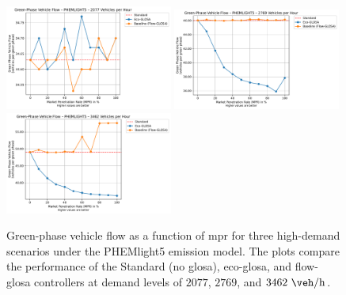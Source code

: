 \begin{figure}[htb]
  \centering
  \includegraphics[width=0.49\textwidth]{data/img/GreenPhaseVehicleFlow/GreenPhaseVehicleFlow_PHEMLIGHT5_Cars1500.pdf}
  \includegraphics[width=0.49\textwidth]{data/img/GreenPhaseVehicleFlow/GreenPhaseVehicleFlow_PHEMLIGHT5_Cars2000.pdf}
  \includegraphics[width=0.49\textwidth]{data/img/GreenPhaseVehicleFlow/GreenPhaseVehicleFlow_PHEMLIGHT5_Cars2500.pdf}
  \caption[Green-phase vehicle flow vs. \ac{mpr} at $2077$, $2769$, and $3462~\unit{\veh\per\hour}$ (PHEMlight5)]{Green-phase vehicle flow as a function of \ac{mpr} for three high-demand scenarios under the PHEMlight5 emission model. The plots compare the performance of the Standard (no \ac{glosa}), \ac{eco-glosa}, and \ac{flow-glosa} controllers at demand levels of $2077$, $2769$, and $3462~\unit{\veh\per\hour}$.}
\label{fig:PHEM_Flow}
\end{figure}

